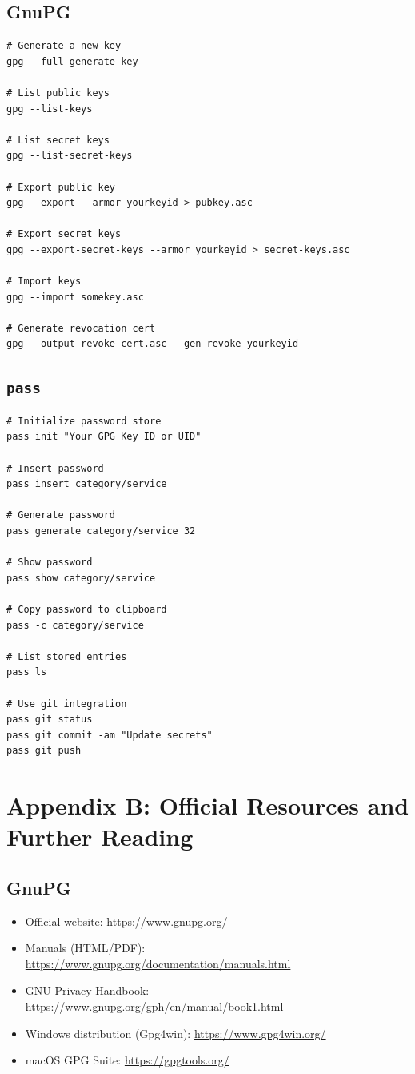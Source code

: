 \documentclass[11pt,a4paper]{article}
\begin{document}
\subsection{GnuPG}

\begin{verbatim}
# Generate a new key
gpg --full-generate-key

# List public keys
gpg --list-keys

# List secret keys
gpg --list-secret-keys

# Export public key
gpg --export --armor yourkeyid > pubkey.asc

# Export secret keys
gpg --export-secret-keys --armor yourkeyid > secret-keys.asc

# Import keys
gpg --import somekey.asc

# Generate revocation cert
gpg --output revoke-cert.asc --gen-revoke yourkeyid
\end{verbatim}

\subsection{\texttt{pass}}

\begin{verbatim}
# Initialize password store
pass init "Your GPG Key ID or UID"

# Insert password
pass insert category/service

# Generate password
pass generate category/service 32

# Show password
pass show category/service

# Copy password to clipboard
pass -c category/service

# List stored entries
pass ls

# Use git integration
pass git status
pass git commit -am "Update secrets"
pass git push
\end{verbatim}

\section{Appendix B: Official Resources and Further Reading}

\subsection{GnuPG}

\begin{itemize}[noitemsep]
  \item Official website: \url{https://www.gnupg.org/}
  \item Manuals (HTML/PDF): \url{https://www.gnupg.org/documentation/manuals.html}
  \item GNU Privacy Handbook: \url{https://www.gnupg.org/gph/en/manual/book1.html}
  \item Windows distribution (Gpg4win): \url{https://www.gpg4win.org/}
  \item macOS GPG Suite: \url{https://gpgtools.org/}
\end{itemize}
\end{document}
